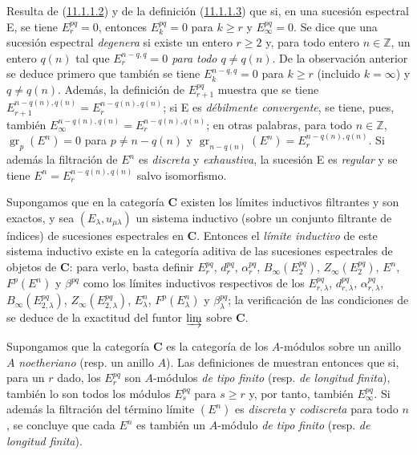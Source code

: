 \begin{env}[11.1.6]
\label{0.11.1.6-fr}
Resulta de (\hyperref[0.11.1.1.2-fr]{11.1.1.2}) y de la definición (\hyperref[0.11.1.1.3-fr]{11.1.1.3}) que si, en una sucesión espectral E, se tiene
$E_r^{pq}=0$, entonces $E_k^{pq}=0$ para $k\geq r$ y $E_\infty^{pq}=0$.
Se dice que una sucesión espectral \emph{degenera} si existe un entero $r\geq2$ y, para todo entero $n\in\mathbb Z$, un entero $q(n)$ tal que \emph{$E_r^{n-q,q}=0$ para todo $q\ne q(n)$}.
De la observación anterior se deduce primero que también se tiene $E_k^{n-q,q}=0$ para $k\geq r$ (incluido $k=\infty$) y $q\ne q(n)$.
Además, la definición de $E_{r+1}^{pq}$ muestra que se tiene $E_{r+1}^{n-q(n),q(n)}=E_r^{n-q(n),q(n)}$; si E es \emph{débilmente convergente}, se tiene, pues, también
$E_\infty^{n-q(n),q(n)}=E_r^{n-q(n),q(n)}$; en otras palabras, para todo $n\in\mathbb Z$, $\operatorname{gr}_p(E^n)=0$ para $p\ne n-q(n)$ y $\operatorname{gr}_{n-q(n)}(E^n)=E_r^{n-q(n),q(n)}$.
Si además la filtración de $E^n$ es \emph{discreta} y \emph{exhaustiva}, la sucesión E es \emph{regular} y se tiene
$E^n=E_r^{n-q(n),q(n)}$ salvo isomorfismo.
\end{env}

\begin{env}[11.1.7]
\label{0.11.1.7}
\label{0.11.1.7-fr}
Supongamos que en la categoría $\boldsymbol{C}$ existen los límites inductivos filtrantes y son exactos, y sea $(E_\lambda,u_{\mu\lambda})$ un sistema inductivo (sobre un conjunto filtrante de índices) de sucesiones espectrales en $\boldsymbol{C}$.
Entonces el \emph{límite inductivo} de este sistema inductivo existe en la categoría aditiva de las sucesiones espectrales de objetos de $\boldsymbol{C}$: para verlo, basta definir $E_r^{pq}$, $d_r^{pq}$, $\alpha_r^{pq}$, $B_\infty(E_2^{pq})$, $Z_\infty(E_2^{pq})$, $E^n$, $F^p(E^n)$ y $\beta^{pq}$ como los límites inductivos respectivos de los $E_{r,\lambda}^{pq}$, $d_{r,\lambda}^{pq}$, $\alpha_{r,\lambda}^{pq}$, $B_\infty(E_{2,\lambda}^{pq})$, $Z_\infty(E_{2,\lambda}^{pq})$, $E_\lambda^n$, $F^p(E_\lambda^n)$ y $\beta_\lambda^{pq}$; la verificación de las condiciones de  se deduce de la exactitud del funtor $\varinjlim$ sobre $\boldsymbol{C}$.
\end{env}

\begin{remark}[11.1.8]
\label{0.11.1.8}
\label{0.11.1.8-fr}
Supongamos que la categoría $\boldsymbol{C}$ es la categoría de los $A$-módulos sobre un anillo $A$ \emph{noetheriano} (resp. un anillo $A$).
Las definiciones de  muestran entonces que si, para un $r$ dado, los $E_r^{pq}$ son $A$-módulos \emph{de tipo finito} (resp. \emph{de longitud finita}), también lo son todos los módulos $E_s^{pq}$ para $s\geq r$ y, por tanto, también $E_\infty^{pq}$.
Si además la filtración del término límite $(E^n)$ es \emph{discreta} y \emph{codiscreta} para todo $n$, se concluye que cada $E^n$ es también un $A$-módulo \emph{de tipo finito} (resp. \emph{de longitud finita}).
\end{remark}

